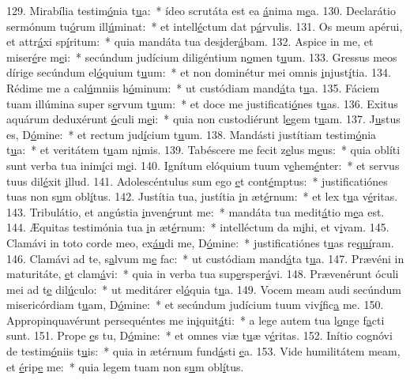 129. Mirabília testim\uline{ó}nia t\uline{u}a:~* ídeo scrutáta est ea \uline{á}nima m\uline{e}a.
130. Declarátio sermónum tu\uline{ó}rum ill\uline{ú}minat:~* et intell\uline{é}ctum dat p\uline{á}rvulis.
131. Os meum apérui, et attr\uline{á}xi sp\uline{í}ritum:~* quia mandáta tua des\uline{i}der\uline{á}bam.
132. Aspice in me, et miser\uline{é}re m\uline{e}i:~* secúndum judícium diligéntium n\uline{o}men t\uline{u}um.
133. Gressus meos dírige secúndum el\uline{ó}quium t\uline{u}um:~* et non dominétur mei omnis \uline{i}njust\uline{í}tia.
134. Rédime me a cal\uline{ú}mniis h\uline{ó}minum:~* ut custódiam mand\uline{á}ta t\uline{u}a.
135. Fáciem tuam illúmina super s\uline{e}rvum t\uline{u}um:~* et doce me justificati\uline{ó}nes t\uline{u}as.
136. Exitus aquárum deduxérunt \uline{ó}culi m\uline{e}i:~* quia non custodiérunt l\uline{e}gem t\uline{u}am.
137. J\uline{u}stus es, D\uline{ó}mine:~* et rectum jud\uline{í}cium t\uline{u}um.
138. Mandásti justítiam testim\uline{ó}nia t\uline{u}a:~* et veritátem t\uline{u}am n\uline{i}mis.
139. Tabéscere me fecit z\uline{e}lus m\uline{e}us:~* quia oblíti sunt verba tua inim\uline{í}ci m\uline{e}i.
140. Ignítum elóquium tuum v\uline{e}hem\uline{é}nter:~* et servus tuus dil\uline{é}xit \uline{i}llud.
141. Adolescéntulus sum ego \uline{e}t cont\uline{é}mptus:~* justificatiónes tuas non s\uline{u}m obl\uline{í}tus.
142. Justítia tua, justítia \uline{i}n æt\uline{é}rnum:~* et lex t\uline{u}a v\uline{é}ritas.
143. Tribulátio, et angústia \uline{i}nven\uline{é}runt me:~* mandáta tua medit\uline{á}tio m\uline{e}a est.
144. Æquitas testimónia tua \uline{i}n æt\uline{é}rnum:~* intelléctum da m\uline{i}hi, et v\uline{i}vam.
145. Clamávi in toto corde meo, ex\uline{áu}di me, D\uline{ó}mine:~* justificatiónes t\uline{u}as re\uline{quí}ram.
146. Clamávi ad te, s\uline{a}lvum m\uline{e} fac:~* ut custódiam mand\uline{á}ta t\uline{u}a.
147. Prævéni in maturitáte, \uline{e}t clam\uline{á}vi:~* quia in verba tua sup\uline{e}rsper\uline{á}vi.
148. Prævenérunt óculi mei ad t\uline{e} dil\uline{ú}culo:~* ut meditárer el\uline{ó}quia t\uline{u}a.
149. Vocem meam audi secúndum misericórdiam t\uline{u}am, D\uline{ó}mine:~* et secúndum judícium tuum viv\uline{í}fic\uline{a} me.
150. Appropinquavérunt persequéntes me in\uline{i}quit\uline{á}ti:~* a lege autem tua l\uline{o}nge f\uline{a}cti sunt.
151. Prope \uline{e}s tu, D\uline{ó}mine:~* et omnes viæ t\uline{u}æ v\uline{é}ritas.
152. Inítio cognóvi de testim\uline{ó}niis t\uline{u}is:~* quia in ætérnum fund\uline{á}sti \uline{e}a.
153. Vide humilitátem meam, et \uline{é}rip\uline{e} me:~* quia legem tuam non s\uline{u}m obl\uline{í}tus.

